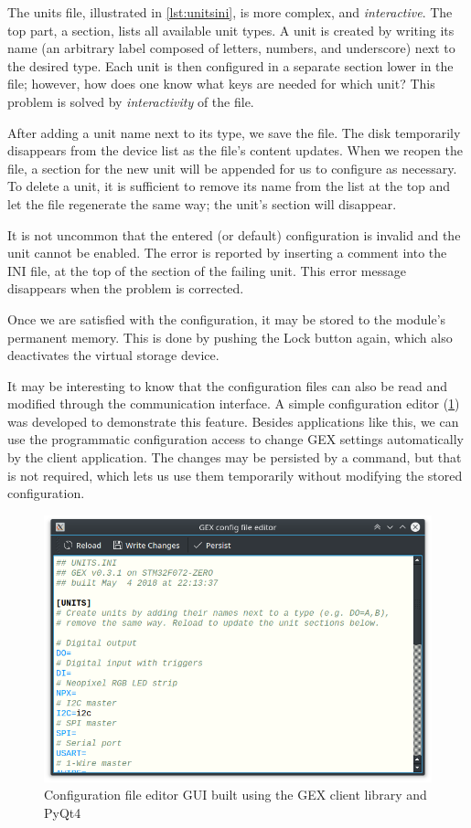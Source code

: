 The units file, illustrated in \cref{lst:unitsini}, is more complex, and \textit{interactive}. The top part, a \mono{[UNITS]} section, lists all available unit types. A unit is created by writing its name (an arbitrary label composed of letters, numbers, and underscore) next to the desired type. Each unit is then configured in a separate section lower in the file; however, how does one know what keys are needed for which unit? This problem is solved by \textit{interactivity} of the file.

After adding a unit name next to its type, we save the file. The disk temporarily disappears from the device list as the file's content updates. When we reopen the file, a section for the new unit will be appended for us to configure as necessary. To delete a unit, it is sufficient to remove its name from the list at the top and let the file regenerate the same way; the unit's section will disappear.

It is not uncommon that the entered (or default) configuration is invalid and the unit cannot be enabled. The error is reported by inserting a comment into the INI file, at the top of the section of the failing unit. This error message disappears when the problem is corrected.

Once we are satisfied with the configuration, it may be stored to the module's permanent memory. This is done by pushing the Lock button again, which also deactivates the virtual storage device.

It may be interesting to know that the configuration files can also be read and modified through the communication interface. A simple configuration editor (\cref{fig:gexync}) was developed to demonstrate this feature. Besides applications like this, we can use the programmatic configuration access to change GEX settings automatically by the client application. The changes may be persisted by a command, but that is not required, which lets us use them temporarily without modifying the stored configuration.

\begin{figure}
	\centering
	\includegraphics[width=.8\textwidth] {img/gexync.png}
	\caption[Configuration file editor GUI]{\label{fig:gexync}Configuration file editor GUI built using the GEX client library and PyQt4}
\end{figure}



















